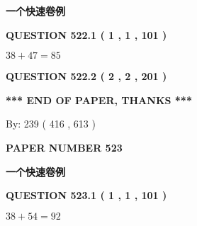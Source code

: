 \documentclass{ctexart}
\begin{document}
   
   
   
 \vspace{0.2in}
{\LARGE {\textbf{ 一个快速卷例}}}
   
   
  
\vspace{0.2in}
  
{\textbf{\Large{QUESTION
522.1 
 ( 1 , 1 , 101 )
}}}
  
  
 
 

$ %
38 +  %
47=   %
85$
 
 
  
\vspace{0.2in}
  
{\textbf{\Large{QUESTION
522.2 
 ( 2 , 2 , 201 )
}}}
  
  
   
   
 \vspace{0.2in}
 
   
   
   
   
\vspace{1.0in} 
{\textbf{\large{ *** END OF PAPER, THANKS *** }}} 
   
   
\hspace{1.0in} By: 
 239 ( 416 ,  613 )
   
   
   
   
\newpage 
\setcounter{page}{ 
   523001 } 
   
   
   
   
 {\textbf{ \Large{ PAPER NUMBER  523  }}}
   
   
\vspace{0.2in}
   
   
   
   
   
   
 \vspace{0.2in}
{\LARGE {\textbf{ 一个快速卷例}}}
   
   
  
\vspace{0.2in}
  
{\textbf{\Large{QUESTION
523.1 
 ( 1 , 1 , 101 )
}}}
  
  
 
 

$ %
38 +  %
54=   %
92$
 
 
  
\vspace{0.2in}
  
\end{document}

